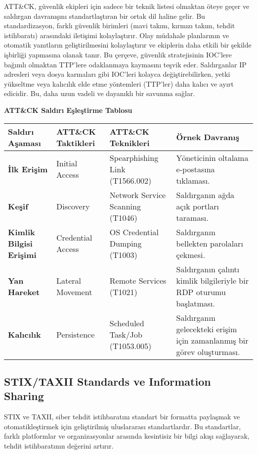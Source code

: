 ATT\&CK, güvenlik ekipleri için sadece bir teknik listesi olmaktan öteye geçer ve saldırgan davranışını standartlaştıran bir ortak dil haline gelir. Bu standardizasyon, farklı güvenlik birimleri (mavi takım, kırmızı takım, tehdit istihbaratı) arasındaki iletişimi kolaylaştırır. Olay müdahale planlarının ve otomatik yanıtların geliştirilmesini kolaylaştırır ve ekiplerin daha etkili bir şekilde işbirliği yapmasına olanak tanır. Bu çerçeve, güvenlik stratejisinin IOC'lere bağımlı olmaktan TTP'lere odaklanmaya kaymasını teşvik eder. Saldırganlar IP adresleri veya dosya karmaları gibi IOC'leri kolayca değiştirebilirken, yetki yükseltme veya kalıcılık elde etme yöntemleri (TTP'ler) daha kalıcı ve ayırt edicidir. Bu, daha uzun vadeli ve dayanıklı bir savunma sağlar.

\textbf{ATT\&CK Saldırı Eşleştirme Tablosu}

\begin{tabularx}{\textwidth}{|l|X|X|X|}
\hline
\textbf{Saldırı Aşaması} & \textbf{ATT\&CK Taktikleri} & \textbf{ATT\&CK Teknikleri} & \textbf{Örnek Davranış} \\
\hline
\textbf{İlk Erişim} & Initial Access & Spearphishing Link (T1566.002) & Yöneticinin oltalama e-postasına tıklaması. \\
\hline
\textbf{Keşif} & Discovery & Network Service Scanning (T1046) & Saldırganın ağda açık portları taraması. \\
\hline
\textbf{Kimlik Bilgisi Erişimi} & Credential Access & OS Credential Dumping (T1003) & Saldırganın bellekten parolaları çekmesi. \\
\hline
\textbf{Yan Hareket} & Lateral Movement & Remote Services (T1021) & Saldırganın çalıntı kimlik bilgileriyle bir RDP oturumu başlatması. \\
\hline
\textbf{Kalıcılık} & Persistence & Scheduled Task/Job (T1053.005) & Saldırganın gelecekteki erişim için zamanlanmış bir görev oluşturması. \\
\hline
\end{tabularx}

\subsection{STIX/TAXII Standards ve Information Sharing}

STIX ve TAXII, siber tehdit istihbaratını standart bir formatta paylaşmak ve otomatikleştirmek için geliştirilmiş uluslararası standartlardır. Bu standartlar, farklı platformlar ve organizasyonlar arasında kesintisiz bir bilgi akışı sağlayarak, tehdit istihbaratının değerini artırır.

